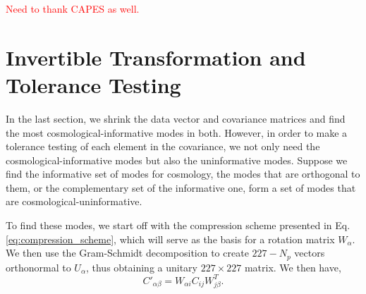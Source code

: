 \documentclass[twocolumn]{\docclass}
\newcommand\be{\begin{equation}}
\newcommand\ee{\end{equation}}
\begin{document}
	
	
	
	
	
	\textcolor{red}{Need to thank CAPES as well.}
	
	\appendix
		\section{Invertible Transformation and Tolerance Testing}
	
	In the last section, we shrink the data vector and covariance matrices and find the most cosmological-informative modes in both. However, in order to make a tolerance testing of each element in the covariance, we not only need the cosmological-informative modes but also the uninformative modes. Suppose we find the informative set of modes for cosmology, the modes that are orthogonal to them, or the complementary set of the informative one, form a set of modes that are cosmological-uninformative. 
	
	To find these modes, we start off with the compression scheme presented in Eq. \ref{eq:compression_scheme}, which will serve as the basis for a rotation matrix $W_\alpha$. We then use the Gram-Schmidt decomposition to create $227 - N_p$ vectors orthonormal to $U_{\alpha}$, thus obtaining a unitary $227 \times 227$ matrix. We then have,
	\be
	C'_{\alpha\beta} = W_{\alpha i} C_{ij} W^T_{j\beta}.
	\ee
	
\end{document}
